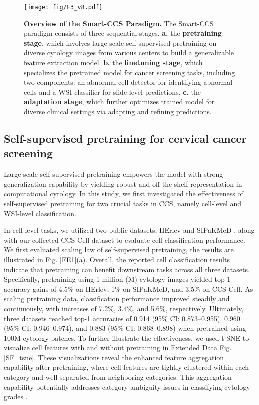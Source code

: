 \begin{figure*}[t]
    \centering
    \texttt{[image: fig/F3\_v8.pdf]}
    \caption{\textbf{Overview of the Smart-CCS Paradigm.} The Smart-CCS paradigm consists of three sequential stages. \textbf{a.} the \textbf{pretraining stage}, which involves large-scale self-supervised pretraining on diverse cytology images from various centers to build a generalizable feature extraction model. \textbf{b.} the \textbf{finetuning stage}, which specializes the pretrained model for cancer screening tasks, including two components: an abnormal cell detector for identifying abnormal cells and a WSI classifier for slide-level  predictions. \textbf{c.} the \textbf{adaptation stage}, which further optimizes trained model for diverse clinical settings via adapting and refining predictions.
    }
    \label{F3_method}
\end{figure*}

\subsection*{Self-supervised pretraining for cervical cancer screening}\label{subsec2-3}
Large-scale self-supervised pretraining empowers the model with strong generalization capability by yielding robust and off-the-shelf representation in computational cytology. 
In this study, we first investigated the effectiveness of self-supervised pretraining for two crucial tasks in CCS, namely cell-level and WSI-level classification. 

In cell-level tasks, we utilized two public datasets, HErlev \cite{jantzen2005pap} and SIPaKMeD \cite{plissiti2018sipakmed}, along with our collected CCS-Cell dataset to evaluate cell classification performance. We first evaluated scaling law of self-supervised pretraining, the results are illustrated in Fig. \ref{FE1}(a). Overall, the reported cell classification results indicate that pretraining can benefit downstream tasks across all three datasets. Specifically, pretraining using 1 million (M) cytology images yielded top-1 accuracy gains of 4.5\% on HErlev, 1\% on SIPaKMeD, and 3.5\% on CCS-Cell. As scaling pretraining data, classification performance improved steadily and continuously, with increases of 7.2\%, 3.4\%, and 5.6\%, respectively. Ultimately, three datasets reached top-1 accuracies of 0.914 (95\% CI: 0.873–0.955), 0.960 (95\% CI: 0.946–0.974), and 0.883 (95\% CI: 0.868–0.898) when pretrained using 100M cytology patches. 
 To further illustrate the effectiveness, we used t-SNE to visualize cell features with and without pretraining in Extended Data Fig. \ref{SF_tsne}. These visualizations reveal the enhanced feature aggregation capability after pretraining, where cell features are tightly clustered within each category and well-separated from neighboring categories. This aggregation capability potentially addresses category ambiguity issues in classifying cytology grades \cite{jiang2024holistic}.

